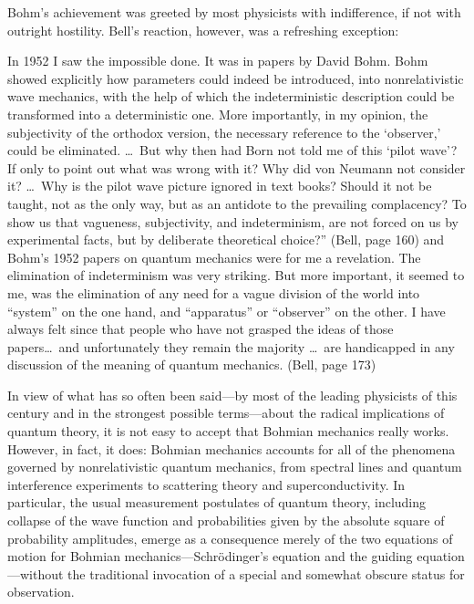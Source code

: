 Bohm's achievement was greeted by most physicists with indifference, if not
with outright hostility.  Bell's reaction, however, was a refreshing exception:

\bq\noindent In 1952 I saw the impossible done.  It was in papers by David
Bohm. Bohm showed explicitly how parameters could indeed be introduced,
into nonrelativistic wave mechanics, with the help of which the
indeterministic description could be transformed into a deterministic one.
More importantly, in my opinion, the subjectivity of the orthodox version,
the necessary reference to the `observer,' could be eliminated.  \dots\  But
why then had Born not told me of this `pilot wave'?  If only to point out
what was wrong with it? Why did von Neumann not consider it? \dots\  Why is the
pilot wave picture ignored in text books?  Should it not be taught, not as
the only way, but as an antidote to the prevailing complacency? To show us
that vagueness, subjectivity, and indeterminism, are not forced on us by
experimental facts, but by deliberate theoretical choice?'' (Bell, page
160)
\eq
and
\bq\noindent Bohm's 1952 papers on quantum mechanics were for me a
revelation. The elimination of indeterminism was very striking. But more
important, it seemed to me, was the elimination of any need for a vague
division of the world into ``system'' on the one hand, and ``apparatus'' or
``observer'' on the other. I have always felt since that people who have
not grasped the ideas of those papers\dots\  and unfortunately they remain the
majority \dots\  are handicapped in any discussion of the meaning of quantum
mechanics. (Bell, page 173)
\eq

In view of what has so often been said---by most of the leading physicists
of this century and in the strongest possible terms---about the radical
implications of quantum theory, it is not easy to accept that Bohmian
mechanics really works.  However, in fact, it does: Bohmian mechanics
accounts for all of the phenomena governed by nonrelativistic quantum
mechanics, from spectral lines and quantum interference experiments to
scattering theory and superconductivity.  In particular, the usual
measurement postulates of quantum theory, including collapse of the wave
function and probabilities given by the absolute square of probability
amplitudes, emerge as a consequence merely of the two equations of motion
for Bohmian mechanics---Schr\"odinger's equation and the guiding
equation---without the traditional invocation of a special and somewhat
obscure status for observation.

